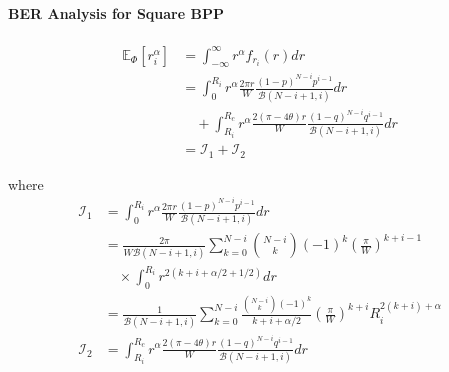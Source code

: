 \documentclass{beamer}
\providecommand{\sbrak}[1]{\ensuremath{{}\left[#1\right]}}
\providecommand{\brak}[1]{\ensuremath{\left(#1\right)}}
\theoremstyle{remark}
\begin{document}
\begin{frame}
\frametitle{\,}
\framesubtitle{BER Analysis for Square BPP}
  \begin{align}
   \mathbb{E}_{\Phi}\sbrak{r_i^{\alpha}} & =\int_{-\infty}^{\infty}r^{\alpha}f_{r_i}(r)dr \nonumber \\
   & = \int_{0}^{R_i}r^{\alpha}\frac{2\pi r}{W}\frac{\brak{1-p}^{N-i}p^{i-1}}{\mathcal{B}\brak{N-i+1,
   i}}dr \nonumber \\
   &\quad  +\int_{R_i}^{R_c}r^{\alpha}\frac{2\brak{\pi-4\theta} r}{W}\frac{\brak{1-q}^{N-i}q^{i-1}}{\mathcal{B}\brak{N-i+1,i}}dr \nonumber
   \\
    & =   \mathcal{I}_1 + \mathcal{I}_2 \nonumber
   \end{align}
   \end{frame}
   \begin{frame}
   where
   \begin{align}
    \mathcal{I}_1& = \int_{0}^{R_i}r^{\alpha}\frac{2\pi r}{W}\frac{\brak{1-p}^{N-i}p^{i-1}}{\mathcal{B}\brak{N-i+1,i}}dr \nonumber \\
   & = \frac{2\pi }{W\mathcal{B}\brak{N-i+1,i}}\sum_{k=0}^{N-i}\binom{N-i}{k}(-1)^k\brak{\frac{\pi}{W}}^{k+i-1}
  \nonumber \\
  &\quad \times\int_{0}^{R_i}r^{2\brak{k+i+\alpha/2+1/2}} dr \nonumber
     \\
       & = \frac{1 }{\mathcal{B}\brak{N-i+1,i}}\sum_{k=0}^{N-i}\frac{\binom{N-i}{k}(-1)^k}{k+i+\alpha/2}\brak{\frac{\pi}{W}}^{k+i}R_i^{2\brak{k+i}+\alpha}
       \\
    \mathcal{I}_2 & = \int_{R_i}^{R_c}r^{\alpha}\frac{2\brak{\pi-4\theta} r}{W}\frac{\brak{1-q}^{N-i}q^{i-1}}{\mathcal{B}\brak{N-i+1,i}}dr \nonumber \\

\end{align}
\end{frame}
\end{document}
